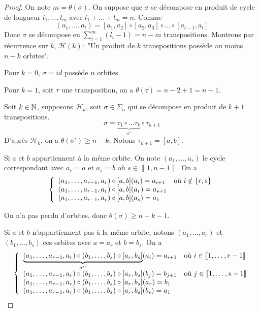 \begin{proof}
	On note $m=\theta(\sigma)$. On suppose que $\sigma$ se décompose en produit de cycle de longueur $l_{1},\dots,l_{m}$ avec $l_{1}+\dots+l_{m}=n$. Comme
	\begin{equation}
		(a_{1},\dots,a_{l})=[a_{1},a_{2}]\circ[a_{2},a_{3}]\circ\dots\circ[a_{l-1},a_{l}]
	\end{equation}
	Donc $\sigma$ se décompose en $\sum_{i=1}^{m}(l_{i}-1)=n-m$ transpositions. Montrons par récurrence sur $k$, $\mathcal{H}(k)\colon$ "Un produit de $k$ transpositions possède au moins $n-k$ orbites".

	Pour $k=0$, $\sigma=id$ possède $n$ orbites.

	Pour $k=1$, soit $\tau$ une transposition, on a $\theta(\tau)=n-2+1=n-1$.

	Soit $k\in\mathbb{N}$, supposons $\mathcal{H}_{k}$, soit $\sigma\in\Sigma_{n}$ qui se décompose en produit de $k+1$ transpositions.
	\begin{equation}
		\sigma=\underbrace{\tau_{1}\circ\dots\tau_{k}}_{\sigma'}\circ\tau_{k+1}
	\end{equation}
	D'après $\mathcal{H}_{k}$, on a $\theta(\sigma')\geqslant n-k$. Notons $\tau_{k+1}=[a,b]$. 
	
	Si $a$ et $b$ appartiennent à la même orbite. On note $(a_{1},\dots,a_{r})$ le cycle correspondant avec $a_{r}=a$ et $a_{s}=b$ où $s\in\left\llbracket 1,n-1\right\rrbracket$. On a 
	\begin{equation}
		\left\{
			\begin{array}[]{ll}
				(a_{1},\dots,a_{r-1},a_{r})\circ[a,b](a_{i})=a_{i+1} &\text{où }i\notin\{r,s\}\\
				(a_{1},\dots,a_{r-1},a_{r})\circ[a,b](a_{r})=a_{s+1}&\\
				(a_{1},\dots,a_{r-1},a_{r})\circ[a,b](a_{s})=a_{1}&
			\end{array}
		\right.
	\end{equation}
	
	On n'a pas perdu d'orbites, donc $\theta(\sigma)\geqslant n-k-1$. 

	Si $a$ et $b$ n'appartiennent pas à la même orbite, notons $(a_{1},\dots,a_{r})$ et $(b_{1},\dots,b_{s})$ ces orbites avec $a=a_{r}$ et $b=b_{s}$. On a 
	\begin{equation}
		\left\{
			\begin{array}[]{ll}
				\underbrace{(a_{1},\dots,a_{r-1},a_{r})\circ(b_{1},\dots,b_{s})\circ[a_{r},b_{s}]}_{\sigma''}(a_{i})=a_{i+1} &\text{où }i\in\left\llbracket 1,\dots,r-1\right\rrbracket\\
				(a_{1},\dots,a_{r-1},a_{r})\circ(b_{1},\dots,b_{s})\circ[a_{r},b_{s}](b_{j})=b_{j+1} &\text{où }j\in\left\llbracket 1,\dots,s-1\right\rrbracket\\
				(a_{1},\dots,a_{r-1},a_{r})\circ(b_{1},\dots,b_{s})\circ[a_{r},b_{s}](a_{r})=b_{1}&\\
				(a_{1},\dots,a_{r-1},a_{r})\circ(b_{1},\dots,b_{s})\circ[a_{r},b_{s}](b_{s})=a_{1}&
			\end{array}
		\right.	
	\end{equation}


\end{proof}
